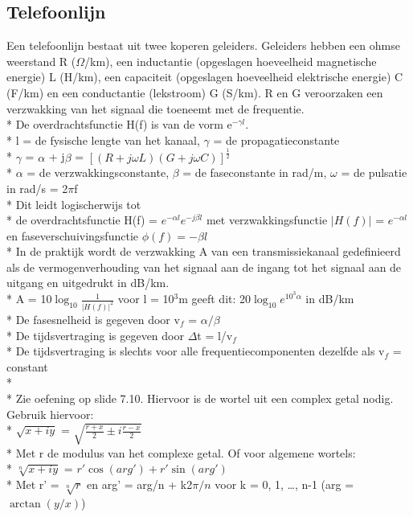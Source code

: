 \documentclass[10pt]{article}
\begin{document}
\subsection{Telefoonlijn}
Een telefoonlijn bestaat uit twee koperen geleiders. Geleiders hebben een ohmse weerstand R ($\Omega$/km), een inductantie (opgeslagen hoeveelheid magnetische energie) L (H/km), een capaciteit (opgeslagen hoeveelheid elektrische energie) C (F/km) en een conductantie (lekstroom) G (S/km). R en G veroorzaken een verzwakking van het signaal die toeneemt met de frequentie.\\*
De overdrachtsfunctie H(f) is van de vorm e$^{-\gamma l}$.\\*
{\scriptsize l = de fysische lengte van het kanaal, $\gamma$ = de propagatieconstante}\\*
$\gamma$ = $\alpha$ + j$\beta$ = $\left[\left(R + j\omega L\right)\left(G + j\omega C\right)\right]^{\frac{1}{2}}$\\*
{\scriptsize $\alpha$ = de verzwakkingsconstante, $\beta$ = de faseconstante in rad/m, $\omega$ = de pulsatie in rad/s = 2$\pi$f}\\*
Dit leidt logischerwijs tot\\*
de overdrachtsfunctie H(f) = $e^{-\alpha l}e^{-j\beta l}$ met verzwakkingsfunctie $|H(f)|$ = $e^{-\alpha l}$ en faseverschuivingsfunctie $\phi(f) = -\beta l$\\*
{\scriptsize In de praktijk wordt de verzwakking A van een transmissiekanaal gedefinieerd als de vermogenverhouding van het signaal aan de ingang tot het signaal aan de uitgang en uitgedrukt in dB/km.\\*
A = 10$\log_{10}{\frac{1}{|H(f)|^2}}$ voor l = 10$^3$m geeft dit: 20$\log_{10}{e^{10^3\alpha}}$ in dB/km\\*
De fasesnelheid is gegeven door v$_f$ = $\alpha/\beta$\\*
De tijdsvertraging is gegeven door $\Delta$t = l/v$_f$\\*
De tijdsvertraging is slechts voor alle frequentiecomponenten dezelfde als v$_f$ = constant\\*\\*
Zie oefening op slide 7.10. Hiervoor is de wortel uit een complex getal nodig. Gebruik hiervoor:\\*
$\sqrt{x + iy}$ = $\sqrt{\frac{r + x}{2}\pm i\frac{r-x}{2}}$\\*
Met r de modulus van het complexe getal. Of voor algemene wortels:\\*
$\sqrt[n]{x + iy}$ = $r'\cos{(arg')} + r'\sin{(arg')}$\\*
Met r' = $\sqrt[n]{r}$ en arg' = arg/n + k2$\pi/n$ voor k = 0, 1, \dots, n-1 (arg = $\arctan{(y/x)}$)}
\end{document}
